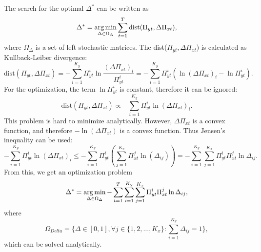 The search for the optimal $\Delta^{*}$ can be written as
\begin{equation}
    \Delta^* = \operatorname*{arg\,min}_{\Delta \in \Omega_{\Delta}} \sum_{t=1}^T \text{dist}(\Pi_{yt}, \Delta\Pi_{xt}),
\end{equation}
where $\Omega_{\Delta}$ is a set of left stochastic matrices. The dist($\Pi_{yt}, \Delta\Pi_{xt}$) is calculated as Kullback-Leiber divergence\cite{Kullback1951}:
\begin{equation}
    \text{dist}(\Pi_{yt}, \Delta\Pi_{xt}) = - \sum_{i=1}^{K_y} \Pi_{yt}^i \ln\frac{(\Delta\Pi_{xt})_i}{\Pi_{yt}^i} = - \sum_{i=1}^{K_y} \Pi_{yt}^i (\ln (\Delta\Pi_{xt})_i - \ln \Pi_{yt}^i).
\end{equation}
For the optimization, the term $\ln \Pi_{yt}^i$ is constant, therefore it can be ignored:
\begin{equation}
    \text{dist}(\Pi_{yt}, \Delta\Pi_{xt}) \propto - \sum_{i=1}^{K_y} \Pi_{yt}^i \ln (\Delta\Pi_{xt})_i.
\end{equation}
This problem is hard to minimize analytically. However, $\Delta\Pi_{xt}$ is a convex function, and therefore $-\ln(\Delta\Pi_{xt})$ is a convex function. Thus Jensen's inequality can be used:
\begin{equation}
    - \sum_{i=1}^{K_y} \Pi_{yt}^i \ln (\Delta\Pi_{xt})_i \leq - \sum_{i=1}^{K_y} \Pi_{yt}^i ( \sum_{j=1}^{K_x} \Pi_{xt}^j \ln (\Delta_{ij}) ) = - \sum_{i=1}^{K_y} \sum_{j=1}^{K_x} \Pi_{yt}^i \Pi_{xt}^j \ln \Delta_{ij}.
\end{equation}
From this, we get an optimization problem
\begin{equation}
    \Delta^* = \operatorname*{arg\,min}_{\Delta \in \Omega_{\Delta}} - \sum_{t=1}^T \sum_{i=1}^{K_y} \sum_{j=1}^{K_x} \Pi_{yt}^i \Pi_{xt}^j \ln \Delta_{ij},
\end{equation}
where
\begin{equation}
    \Omega_{Delta} = \{ \Delta \in [0, 1], \forall j \in \{ 1, 2, \dots, K_x \} : \sum_{i=1}^{K_y} \Delta_{ij} = 1 \},
\end{equation}
which can be solved analytically.

